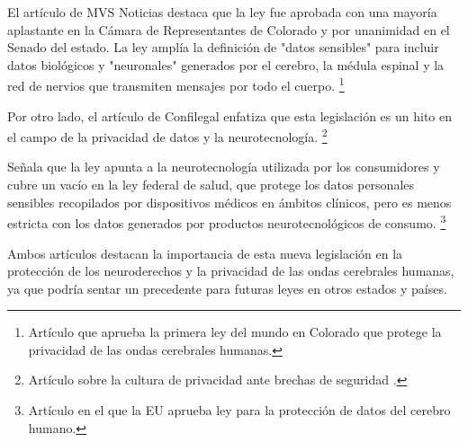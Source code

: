 El artículo de MVS Noticias destaca que la ley fue aprobada con una mayoría aplastante en la Cámara de Representantes de Colorado y por unanimidad en el Senado del estado. La ley amplía la definición de "datos sensibles" para incluir datos biológicos y "neuronales" generados por el cerebro, la médula espinal y la red de nervios que transmiten mensajes por todo el cuerpo. \footnote{Artículo que aprueba la primera ley del mundo en Colorado que protege la privacidad de las ondas cerebrales humanas\cite{confilegal_priv}.}

Por otro lado, el artículo de Confilegal enfatiza que esta legislación es un hito en el campo de la privacidad de datos y la neurotecnología. \footnote{Artículo sobre la cultura de privacidad ante brechas de seguridad \cite{confilega_cul}.}

 Señala que la ley apunta a la neurotecnología utilizada por los consumidores y cubre un vacío en la ley federal de salud, que protege los datos personales sensibles recopilados por dispositivos médicos en ámbitos clínicos, pero es menos estricta con los datos generados por productos neurotecnológicos de consumo. \footnote{Artículo en el que la EU aprueba ley para la protección de datos del cerebro humano\cite{mvsnoticias}.}
 
Ambos artículos destacan la importancia de esta nueva legislación en la protección de los neuroderechos y la privacidad de las ondas cerebrales humanas, ya que podría sentar un precedente para futuras leyes en otros estados y países.
